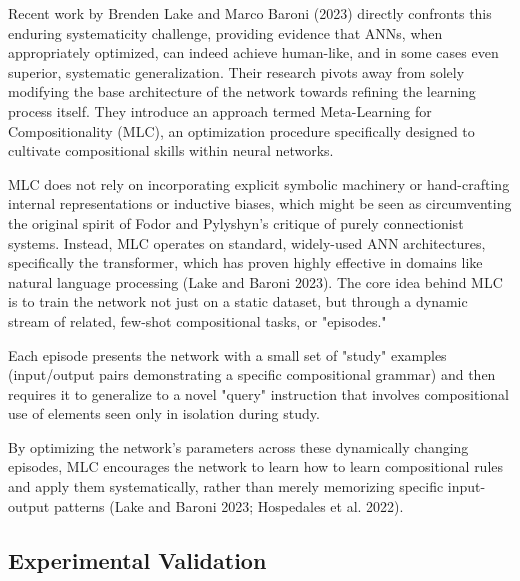 \documentclass[
10pt, %
a4paper, %
oneside, %
headinclude,footinclude, %
BCOR5mm, %
]{scrartcl}
\begin{document}
Recent work by Brenden Lake and Marco Baroni (2023) directly confronts this enduring systematicity challenge, providing evidence that ANNs, when appropriately optimized, can indeed achieve human-like, and in some cases even superior, systematic generalization. Their research pivots away from solely modifying the base architecture of the network towards refining the learning process itself. They introduce an approach termed Meta-Learning for Compositionality (MLC), an optimization procedure specifically designed to cultivate compositional skills within neural networks. 

MLC does not rely on incorporating explicit symbolic machinery or hand-crafting internal representations or inductive biases, which might be seen as circumventing the original spirit of Fodor and Pylyshyn's critique of purely connectionist systems. Instead, MLC operates on standard, widely-used ANN architectures, specifically the transformer, which has proven highly effective in domains like natural language processing (Lake and Baroni 2023). The core idea behind MLC is to train the network not just on a static dataset, but through a dynamic stream of related, few-shot compositional tasks, or "episodes." {Each episode presents the network with a small set of "study" examples (input/output pairs demonstrating a specific compositional grammar) and then requires it to generalize to a novel "query" instruction that involves compositional use of elements seen only in isolation during study. 

By optimizing the network's parameters across these dynamically changing episodes, MLC encourages the network to learn how to learn compositional rules and apply them systematically, rather than merely memorizing specific input-output patterns (Lake and Baroni 2023; Hospedales et al. 2022).}

\subsection{Experimental Validation}
\end{document}
